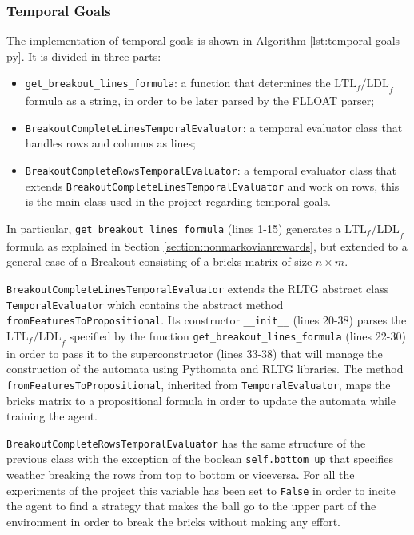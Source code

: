 \subsubsection{Temporal Goals}
The implementation of temporal goals is shown in Algorithm
\ref{lst:temporal-goals-py}. It is divided in three parts:
\begin{itemize}
    \item \texttt{get_breakout_lines_formula}: a function that determines the
        $\text{LTL}_f\text{/LDL}_f$ formula as a string, in order to be
        later parsed by the FLLOAT parser;
    \item \texttt{BreakoutCompleteLinesTemporalEvaluator}: a
        temporal evaluator class that handles rows and columns as lines;
    \item \texttt{BreakoutCompleteRowsTemporalEvaluator}: a temporal evaluator
        class that extends \texttt{BreakoutCompleteLinesTemporalEvaluator} and
        work on rows, this is the main class used in the project regarding
        temporal goals.
\end{itemize}

In particular, \texttt{get_breakout_lines_formula} (lines 1-15) generates a
$\text{LTL}_f\text{/LDL}_f$ formula as explained in Section
\ref{section:nonmarkovianrewards}, but extended to a general case of a Breakout
consisting of a bricks matrix of size $n \times m$.

\texttt{BreakoutCompleteLinesTemporalEvaluator} extends the RLTG abstract class
\texttt{TemporalEvaluator} which contains the abstract method
\texttt{fromFeaturesToPropositional}. Its constructor \texttt{__init__} (lines
20-38) parses the $\text{LTL}_f\text{/LDL}_f$ specified by the function
\texttt{get_breakout_lines_formula} (lines 22-30) in order to pass it to
the superconstructor (lines 33-38) that will manage the construction of the
automata using Pythomata and RLTG libraries. The method
\texttt{fromFeaturesToPropositional}, inherited from \texttt{TemporalEvaluator},
maps the bricks matrix to a propositional formula in order to update the
automata while training the agent.

\texttt{BreakoutCompleteRowsTemporalEvaluator} has the same structure of the
previous class with the exception of the boolean \texttt{self.bottom_up} that
specifies weather breaking the rows from top to bottom or viceversa.
For all the experiments of the project this variable has been set to
\texttt{False} in order to incite the agent to find a strategy that makes the
ball go to the upper part of the environment in order to break the bricks
without making any effort.


